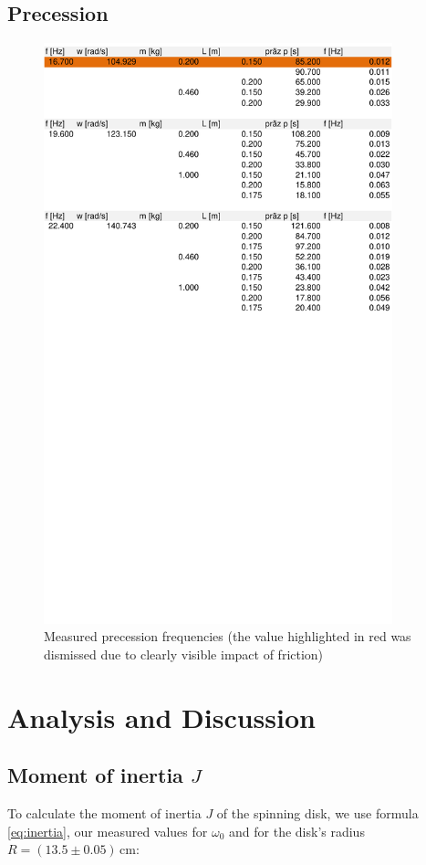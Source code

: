 \documentclass{scrreprt}
\newcommand{\unit}[1]{\ensuremath{\, \mathrm{#1}}}
\begin{document}
\subsection{Precession}
\begin{figure}[H]
	\centering
  \includegraphics[width=0.9\textwidth]{diag/precession.pdf}
	\caption{Measured precession frequencies (the value highlighted in red was dismissed due to clearly visible impact of friction)}
	\label{fig:precession}
\end{figure}

\section{Analysis and Discussion}

\subsection{Moment of inertia $J$}
To calculate the moment of inertia $J$ of the spinning disk, we use formula \ref{eq:inertia}, our measured values for $\omega_0$ and for the disk's radius $R = (13.5 \pm 0.05) \unit{cm}$:
\end{document}
